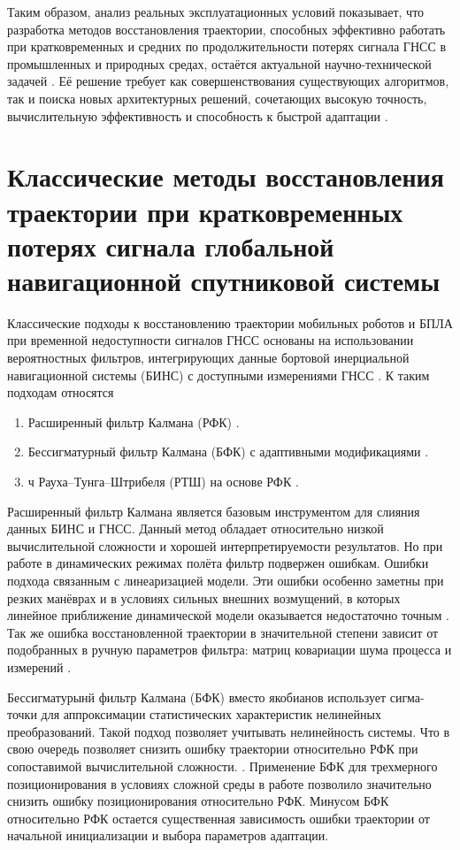 Таким образом, анализ реальных эксплуатационных условий показывает, что разработка методов восстановления траектории, способных эффективно работать при кратковременных и средних по продолжительности потерях сигнала ГНСС в промышленных и природных средах, остаётся актуальной научно-технической задачей \cite{Tavasci2024, Pang2024, Kim2023, Wang2025, Niu2026, uav_inspection}. Её решение требует как совершенствования существующих алгоритмов, так и поиска новых архитектурных решений, сочетающих высокую точность, вычислительную эффективность и способность к быстрой адаптации \cite{Chen2024, Bianchi2024, Alaba2024}.


\section{Классические методы восстановления траектории при кратковременных потерях сигнала глобальной навигационной спутниковой системы}
\label{sec:1.2}

Классические подходы к восстановлению траектории мобильных роботов и БПЛА при временной недоступности сигналов ГНСС основаны на использовании вероятностных фильтров, интегрирующих данные бортовой инерциальной навигационной системы (БИНС) с доступными измерениями ГНСС \cite{Cahyadi2023, Eling2015}. К таким подходам относятся 
\begin{enumerate}
	\item Расширенный фильтр Калмана (РФК) \cite{Eling2015, Cahyadi2023}.
	\item Бессигматурный фильтр Калмана (БФК) с адаптивными модификациями \cite{Cahyadi2023}.
	\item ч Рауха–Тунга–Штрибеля (РТШ) на основе РФК \cite{Fang2020}.
\end{enumerate}
	
Расширенный фильтр Калмана является базовым инструментом для слияния данных БИНС и ГНСС. Данный метод обладает относительно низкой вычислительной сложности и хорошей интерпретируемости результатов. Но при работе в динамических режимах полёта фильтр подвержен ошибкам. Ошибки подхода связанным с линеаризацией модели. Эти ошибки особенно заметны при резких манёврах и в условиях сильных внешних возмущений, в которых линейное приближение динамической модели оказывается недостаточно точным \cite{Saif2022, Tahir2016}. Так же ошибка восстановленной траектории в значительной степени зависит от подобранных в ручную параметров фильтра: матриц ковариации шума процесса и измерений \cite{Eling2015}.

Бессигматурынй фильтр Калмана (БФК) вместо якобианов использует сигма-точки для аппроксимации статистических характеристик нелинейных преобразований. Такой подход позволяет учитывать нелинейность системы. Что в свою очередь позволяет снизить ошибку траектории относительно РФК при сопоставимой вычислительной сложности. \cite{Eling2015, Saif2022}. Применение БФК для трехмерного позиционирования в условиях сложной среды в работе \cite{Fang2020} позволило значительно снизить ошибку позиционирования относительно РФК. Минусом БФК относительно РФК остается существенная зависимость ошибки траектории от начальной инициализации и выбора параметров адаптации\cite{Cahyadi2023, Eling2015}. 

